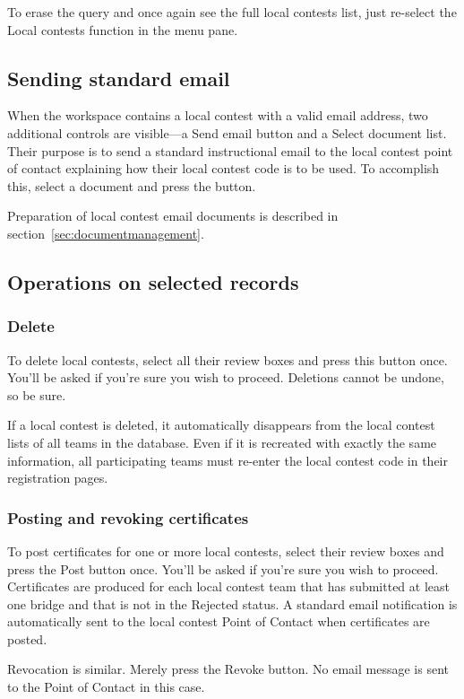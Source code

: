 \documentclass[11pt,letterpaper]{refart}
\def\ui#1{\textsf{#1}}
\begin{document}
To erase the query and once again see the full local contests list, just re-select
the \ui{Local contests} function in the menu pane.

\subsection{Sending standard email}
When the workspace contains a local contest with a valid email address,
two additional controls are visible---a \ui{Send email} button and a 
\ui{Select document} list. Their purpose is to send a standard instructional 
email to the local contest point of contact explaining how their local 
contest code is to be used. To accomplish this, select a document and 
press the button.

Preparation of local contest email documents is described 
in section~\ref{sec:documentmanagement}.

\subsection{Operations on selected records}

\subsubsection{Delete}
To delete local contests, select all their review boxes and press this button
once. You'll be asked if you're sure you wish to proceed. Deletions cannot
be undone, so be sure. 

If a local contest is deleted, it automatically disappears from the local contest
lists of all teams in the database. Even if it is recreated with exactly the same
information, all participating teams must re-enter the local contest code in
their registration pages.

\subsubsection{Posting and revoking certificates}
To post certificates for one or more local contests, select their review boxes
and press the Post button once. You'll be asked if you're sure you wish to proceed.
Certificates are produced for each local contest team that has submitted at least
one bridge and that is not in the Rejected status.  A standard email notification
is automatically sent to the local contest Point of Contact when certificates are
posted.

Revocation is similar. Merely press the Revoke button. No email message is
sent to the Point of Contact in this case.
\end{document}
